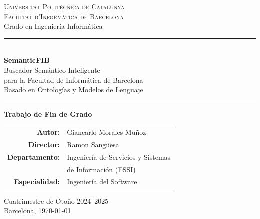 \documentclass[12pt, a4paper, twoside]{report}
\begin{document}
\begin{titlepage}
\begin{center}


\vspace{0.5cm}

{\large\textsc{Universitat Polit\`ecnica de Catalunya}}\\[0.2cm]
{\large\textsc{Facultat d'Inform\`atica de Barcelona}}\\[0.3cm]
{\normalsize Grado en Ingenier\'ia Inform\'atica}

\vspace{1.5cm}

\rule{\textwidth}{1.5pt}\\[0.5cm]
{\Huge\bfseries\color{upcblue} SemanticFIB}\\[0.3cm]
{\Large Buscador Sem\'antico Inteligente\\para la Facultad de Inform\'atica de Barcelona}\\[0.3cm]
{\large Basado en Ontolog\'ias y Modelos de Lenguaje}\\[0.5cm]
\rule{\textwidth}{1.5pt}

\vspace{1.5cm}

{\Large\textbf{Trabajo de Fin de Grado}}

\vspace{2cm}

\begin{tabular}{rl}
  \textbf{Autor:} & Giancarlo Morales Mu\~noz \\[0.3cm]
  \textbf{Director:} & Ramon Sang\"uesa \\[0.3cm]
  \textbf{Departamento:} & Ingenier\'ia de Servicios y Sistemas\\
  & de Informaci\'on (ESSI) \\[0.3cm]
  \textbf{Especialidad:} & Ingenier\'ia del Software \\
\end{tabular}

\vfill

{\large Cuatrimestre de Oto\~no 2024--2025}\\[0.3cm]
{\normalsize Barcelona, \today}

\end{center}
\end{titlepage}
\end{document}
